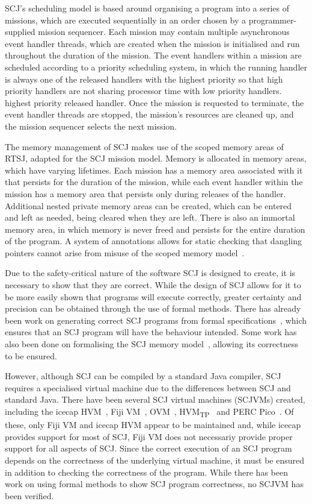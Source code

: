 \documentclass[a4paper,10pt]{report}
\begin{document}
SCJ's scheduling model is based around organising a program into a
series of missions, which are executed sequentially in an order chosen
by a programmer-supplied mission sequencer.
Each mission may contain multiple asynchronous event handler threads,
which are created when the mission is initialised and run throughout
the duration of the mission.
The event handlers within a mission are scheduled according to a
priority scheduling system, in which the running handler is always one
of the released handlers with the highest priority so that high
priority handlers are not sharing processor time with low priority
handlers.
highest priority released handler.
Once the mission is requested to terminate, the event handler threads
are stopped, the mission's resources are cleaned up, and the mission
sequencer selects the next mission.

The memory management of SCJ makes use of the scoped memory areas of
RTSJ, adapted for the SCJ mission model.
Memory is allocated in memory areas, which have varying lifetimes.
Each mission has a memory area associated with it that persists for
the duration of the mission, while each event handler within the
mission has a memory area that persists only during releases of the
handler.
Additional nested private memory areas can be created, which can be
entered and left as needed, being cleared when they are left.
There is also an immortal memory area, in which memory is never freed
and persists for the entire duration of the program.
A system of annotations allows for static checking that dangling
pointers cannot arise from misuse of the scoped memory
model~\cite{tang2010}.

Due to the safety-critical nature of the software SCJ is designed to
create, it is necessary to show that they are correct.
While the design of SCJ allows for it to be more easily shown that
programs will execute correctly, greater certainty and precision can
be obtained through the use of formal methods.
There has already been work on generating correct SCJ programs from
formal specifications~\cite{cavalcanti2011, cavalcanti2013}, which
ensures that an SCJ program will have the behaviour intended.
Some work has also been done on formalising the SCJ memory
model~\cite{cavalcanti2011a}, allowing its correctness to be ensured.

However, although SCJ can be compiled by a standard Java compiler, SCJ
requires a specialised virtual machine due to the differences between
SCJ and standard Java.
There have been several SCJ virtual machines (SCJVMs) created,
including the icecap HVM~\cite{sondergaard2012}, Fiji
VM~\cite{pizlo2009}, OVM~\cite{armbruster2007},
HVM\textsubscript{TP}~\cite{luckow2014} and PERC Pico~\cite{atego2015,
  richard2010}.
Of these, only Fiji VM and icecap HVM appear to be maintained and,
while icecap provides support for most of SCJ, Fiji VM does not
necessariy provide proper support for all aspects of SCJ.
Since the correct execution of an SCJ program depends on the
correctness of the underlying virtual machine, it must be ensured in
addition to checking the correctness of the program.
While there has been work on using formal methods to show SCJ program
correctness, no SCJVM has been verified.
\end{document}
